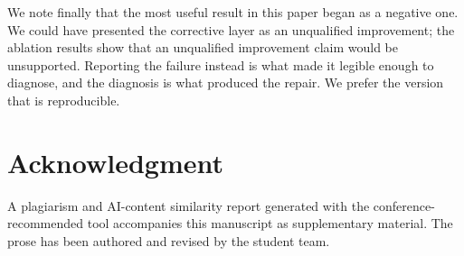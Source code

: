 \documentclass[conference]{IEEEtran}
\begin{document}
We note finally that the most useful result in this paper began as a negative
one. We could have presented the corrective layer as an unqualified improvement;
the ablation results show that an unqualified improvement claim would be unsupported.
Reporting the failure instead is what made it legible enough to diagnose, and
the diagnosis is what produced the repair. We prefer the version that is
reproducible.

\section*{Acknowledgment}
A plagiarism and AI-content similarity report generated with the
conference-recommended tool accompanies this manuscript as supplementary
material. The prose has been authored and revised by the student team.
\end{document}
